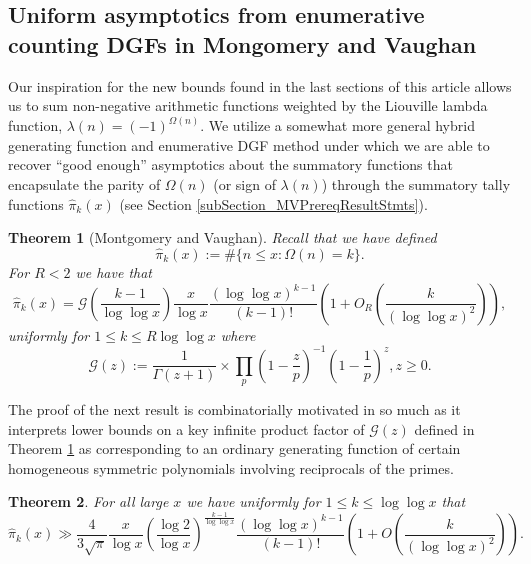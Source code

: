 \documentclass[11pt,reqno,a4letter]{article}
\numberwithin{figure}{section}
\numberwithin{table}{section}
\theoremstyle{plain}
\newtheorem{theorem}{Theorem}
\numberwithin{theorem}{section}
\theoremstyle{definition}
\newcommand{\SuccSim}[0]{\overset{_{\scriptsize{\blacktriangle}}}{\succsim}}
\renewcommand{\SuccSim}[0]{\ensuremath{\gg}}
\begin{document}
\subsection{Uniform asymptotics from enumerative counting DGFs in Mongomery and Vaughan} 

Our inspiration for the new bounds found in the last sections of this article allows us to sum 
non-negative arithmetic functions weighted by the Liouville lambda function, 
$\lambda(n) = (-1)^{\Omega(n)}$. 
We utilize a somewhat more general 
hybrid generating function and enumerative DGF method 
under which we are able to recover ``good enough'' asymptotics about the summatory functions that 
encapsulate the parity of $\Omega(n)$ (or sign of $\lambda(n)$) 
through the summatory tally functions $\widehat{\pi}_k(x)$ 
(see Section \ref{subSection_MVPrereqResultStmts}). 

\begin{theorem}[Montgomery and Vaughan]
\label{theorem_HatPi_ExtInTermsOfGz} 
Recall that we have defined 
$$\widehat{\pi}_k(x) := \#\{n \leq x: \Omega(n)=k\}.$$ 
For $R < 2$ we have that 
\[
\widehat{\pi}_k(x) = \mathcal{G}\left(\frac{k-1}{\log\log x}\right) \frac{x}{\log x} 
     \frac{(\log\log x)^{k-1}}{(k-1)!} \left(1 + O_R\left(\frac{k}{(\log\log x)^2}\right)\right),  
\]
uniformly for $1 \leq k \leq R \log\log x$ where 
\[
\mathcal{G}(z) := \frac{1}{\Gamma(z+1)} \times 
     \prod_p \left(1-\frac{z}{p}\right)^{-1} \left(1-\frac{1}{p}\right)^z, z \geq 0. 
\]
\end{theorem} 

The proof of the next result is combinatorially motivated in so much as it interprets 
lower bounds on a key infinite product factor of $\mathcal{G}(z)$ defined in 
Theorem \ref{theorem_HatPi_ExtInTermsOfGz} 
as corresponding to an ordinary generating function of certain 
homogeneous symmetric polynomials involving reciprocals of the primes. 

\begin{theorem} 
\label{theorem_GFs_SymmFuncs_SumsOfRecipOfPowsOfPrimes} 
\label{cor_BoundsOnGz_FromMVBook_initial_stmt_v1} 
For all large $x$ we have uniformly for $1 \leq k \leq \log\log x$ that 
\[
\widehat{\pi}_k(x) \SuccSim \frac{4}{3\sqrt{\pi}} \frac{x}{\log x} \left(\frac{\log 2}{\log x}\right)^{ 
     \frac{k-1}{\log\log x}} \frac{(\log\log x)^{k-1}}{(k-1)!} \left( 
     1 + O\left(\frac{k}{(\log\log x)^2}\right) 
     \right).
\]
\end{theorem} 
\end{document}
